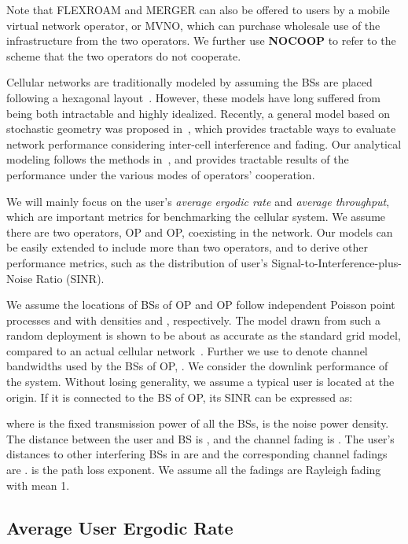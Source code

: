 \documentclass[conference]{IEEEtran}
\begin{document}
Note that FLEXROAM and MERGER can also be offered to users by a mobile virtual network operator, or MVNO, which can purchase wholesale use of the infrastructure from the two operators. We further use \textbf{NOCOOP} to refer to the scheme that the two operators do not cooperate.

Cellular networks are traditionally modeled by assuming the BSs are placed following a hexagonal layout~\cite{Theodore@BOOK02}. However, these models have long suffered from being both intractable and highly idealized. Recently, a general model based on stochastic geometry was proposed in~\cite{Jeffrey@TCOM10}, which provides tractable ways to evaluate network performance considering inter-cell interference and fading. Our analytical modeling follows the methods in~\cite{Jeffrey@TCOM10}, and provides tractable results of the performance under the various modes of operators' cooperation.

We will mainly focus on the user's \textit{average ergodic rate} and \textit{average throughput}, which are important metrics for benchmarking the cellular system. We assume there are two operators, OP and OP, coexisting in the network. Our models can be easily extended to include more than two operators, and to derive other performance metrics, such as the distribution of user's Signal-to-Interference-plus-Noise Ratio (SINR).

We assume the locations of BSs of OP and OP follow independent Poisson point processes  and  with densities  and , respectively. The model drawn from such a random deployment is shown to be about as accurate as the standard grid model, compared to an actual cellular network~\cite{Jeffrey@TCOM10}. Further we use  to denote channel bandwidths used by the BSs of OP, . We consider the downlink performance of the system. Without losing generality, we assume a typical user is located at the origin. If it is connected to the BS  of OP, its SINR can be expressed as:

where  is the fixed transmission power of all the BSs,  is the noise power density. The distance between the user and BS  is , and the channel fading is . The user's distances to other interfering BSs  in  are  and the corresponding channel fadings are .  is the path loss exponent. We assume all the fadings are Rayleigh fading with mean 1.

\subsection{Average User Ergodic Rate}
\end{document}
